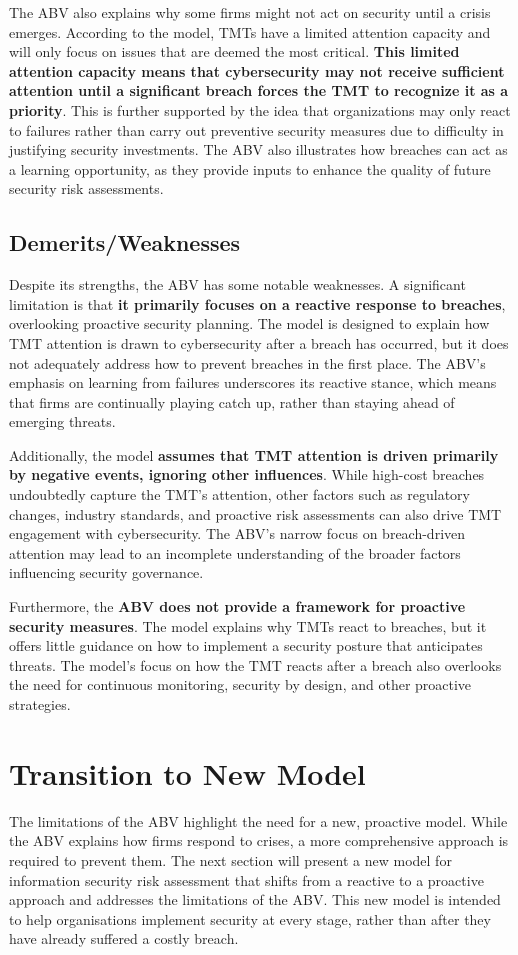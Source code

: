     The ABV also explains why some firms might not act on security until a crisis emerges. According to the model, TMTs have a limited attention capacity and will only focus on issues that are deemed the most critical. \textbf{This limited attention capacity means that cybersecurity may not receive sufficient attention until a significant breach forces the TMT to recognize it as a priority}. This is further supported by the idea that organizations may only react to failures rather than carry out preventive security measures due to difficulty in justifying security investments. The ABV also illustrates how breaches can act as a learning opportunity, as they provide inputs to enhance the quality of future security risk assessments.

    \subsection{Demerits/Weaknesses}
    Despite its strengths, the ABV has some notable weaknesses. A significant limitation is that \textbf{it primarily focuses on a reactive response to breaches}, overlooking proactive security planning. The model is designed to explain how TMT attention is drawn to cybersecurity after a breach has occurred, but it does not adequately address how to prevent breaches in the first place. The ABV's emphasis on learning from failures underscores its reactive stance, which means that firms are continually playing catch up, rather than staying ahead of emerging threats.

    Additionally, the model \textbf{assumes that TMT attention is driven primarily by negative events, ignoring other influences}. While high-cost breaches undoubtedly capture the TMT's attention, other factors such as regulatory changes, industry standards, and proactive risk assessments can also drive TMT engagement with cybersecurity. The ABV’s narrow focus on breach-driven attention may lead to an incomplete understanding of the broader factors influencing security governance.

    Furthermore, the \textbf{ABV does not provide a framework for proactive security measures}. The model explains why TMTs react to breaches, but it offers little guidance on how to implement a security posture that anticipates threats. The model's focus on how the TMT reacts after a breach also overlooks the need for continuous monitoring, security by design, and other proactive strategies.

\section{Transition to New Model}
The limitations of the ABV highlight the need for a new, proactive model. While the ABV explains how firms respond to crises, a more comprehensive approach is required to prevent them. The next section will present a new model for information security risk assessment that shifts from a reactive to a proactive approach and addresses the limitations of the ABV. This new model is intended to help organisations implement security at every stage, rather than after they have already suffered a costly breach.